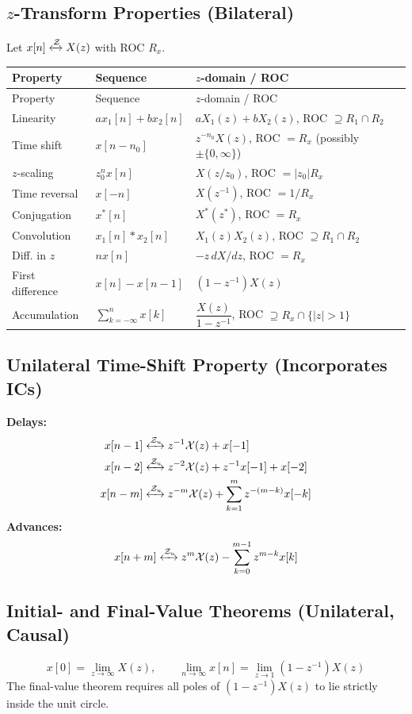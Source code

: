 \documentclass[10pt]{article}
\newcommand{\Z}{\ensuremath{\mathcal{Z}}}
\newcommand{\ztrans}{\xleftrightarrow{\mathcal{Z}}}
\begin{document}
\subsection{$z$-Transform Properties (Bilateral)}
Let $x[n]\ztrans X(z)$ with ROC $R_x$.
\begin{longtable}{@{}lll@{}}
\toprule Property & Sequence & $z$-domain / ROC \\ \midrule \endfirsthead
\toprule Property & Sequence & $z$-domain / ROC \\ \midrule \endhead
\bottomrule \endfoot
Linearity & $ax_1[n] + bx_2[n]$ & $aX_1(z) + bX_2(z)$, ROC $\supseteq R_1 \cap R_2$ \\
Time shift & $x[n - n_0]$ & $z^{-n_0}X(z)$, ROC $= R_x$ (possibly $\pm \{0,\infty\}$) \\
$z$-scaling & $z_0^n x[n]$ & $X(z/z_0)$, ROC $= |z_0| R_x$ \\
Time reversal & $x[-n]$ & $X(z^{-1})$, ROC $= 1/R_x$ \\
Conjugation & $x^*[n]$ & $X^*(z^*)$, ROC $= R_x$ \\
Convolution & $x_1[n]*x_2[n]$ & $X_1(z)X_2(z)$, ROC $\supseteq R_1 \cap R_2$ \\
Diff. in $z$ & $n x[n]$ & $-z\,dX/dz$, ROC $= R_x$ \\
First difference & $x[n] - x[n-1]$ & $(1 - z^{-1})X(z)$ \\
Accumulation & $\sum_{k=-\infty}^n x[k]$ & $\dfrac{X(z)}{1 - z^{-1}}$, ROC $\supseteq R_x \cap \{|z|>1\}$ \\
\end{longtable}

\subsection{Unilateral Time-Shift Property (Incorporates ICs)}
\textbf{Delays:}
\begin{align*}
x[n-1] &\xleftrightarrow{\Z_u} z^{-1}\mathcal{X}(z) + x[-1] \\
x[n-2] &\xleftrightarrow{\Z_u} z^{-2}\mathcal{X}(z) + z^{-1}x[-1] + x[-2] \\
x[n-m] &\xleftrightarrow{\Z_u} z^{-m}\mathcal{X}(z) + \sum_{k=1}^{m} z^{-(m-k)}x[-k]
\end{align*}
\textbf{Advances:}
\[
x[n+m] \xleftrightarrow{\Z_u} z^m\mathcal{X}(z) - \sum_{k=0}^{m-1} z^{m-k}x[k]
\]

\subsection{Initial- and Final-Value Theorems (Unilateral, Causal)}
\[
x[0] = \lim_{z\to\infty} X(z),\qquad
\lim_{n\to\infty} x[n] = \lim_{z\to 1}(1 - z^{-1})X(z)
\]
The final-value theorem requires all poles of $(1-z^{-1})X(z)$ to lie strictly inside the unit circle.
\end{document}
